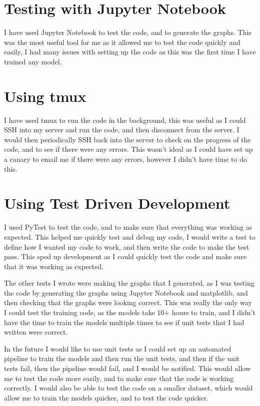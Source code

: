 \documentclass[]{final_report}
\begin{document}
\section{Testing with Jupyter Notebook}
I have used Jupyter Notebook to test the code, and to generate the graphs.
This was the most useful tool for me as it allowed me to test the code quickly and easily,
I had many issues with setting up the code as this was the first time I have trained any model.

\section{Using tmux}
I have used tmux to run the code in the background, this was useful as I could SSH into my server and run the code, and then disconnect from the server.
I would then periodically SSH back into the server to check on the progress of the code, and to see if there were any errors.
This wasn't ideal as I could have set up a canary to email me if there were any errors, however I didn't have time to do this.

\section{Using Test Driven Development}
I used PyTest\cite{PyTest} to test the code, and to make sure that everything was working as expected.
This helped me quickly test and debug my code, I would write a test to define how I wanted my code to work, and then write the code to make the test pass.
This sped up development as I could quickly test the code and make sure that it was working as expected.

The other tests I wrote were making the graphs that I generated, as I was testing the code by generating the graphs using Jupyter Notebook\cite{Jupyter} and matplotlib\cite{Matplotlib},
and then checking that the graphs were looking correct. This was really the only way I could test the training code, as the models take 10+ hours to train,
and I didn't have the time to train the models multiple times to see if unit tests that I had written were correct.

In the future I would like to use unit tests as I could set up an automated pipeline to train the models and then run the unit tests,
and then if the unit tests fail, then the pipeline would fail, and I would be notified. This would allow me to test the code more easily,
and to make sure that the code is working correctly. I would also be able to test the code on a smaller dataset, which would allow me to train the models quicker,
and to test the code quicker.
\end{document}
